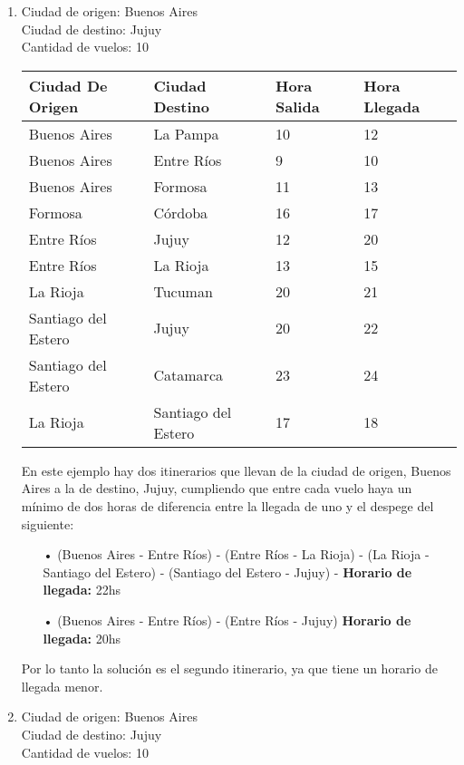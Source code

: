 \noindent \begin{enumerate}
\item
Ciudad de origen: Buenos Aires\\
Ciudad de destino: Jujuy\\
Cantidad de vuelos: 10\\

\begin{center}
	\begin{tabular}{| l | l | l | l |}
	\hline
	Ciudad De Origen & Ciudad Destino & Hora Salida & Hora Llegada\\ \hline
	Buenos Aires & La Pampa & 10 &	12\\
	Buenos Aires & Entre Ríos & 9 & 10 \\
	Buenos Aires & Formosa	&	11	& 13\\
	Formosa	& Córdoba	& 16 & 17  \\
	Entre Ríos & Jujuy	& 12 & 20\\
	Entre Ríos & La Rioja	&	13 & 15\\
	La Rioja & Tucuman	&	20 & 21\\
	Santiago del Estero & Jujuy &	20 & 22\\
	Santiago del Estero	& Catamarca & 23 & 24\\
	La Rioja & Santiago del Estero & 17&18\\
	\hline
	\end{tabular}
\end{center}


En este ejemplo hay dos itinerarios que llevan de la ciudad de origen, Buenos Aires a la de destino, Jujuy, cumpliendo que entre cada vuelo haya un mínimo de dos horas de diferencia entre la llegada de uno y el despege del siguiente:
\begin{itemize}
\item[•] (Buenos Aires - Entre Ríos) - (Entre Ríos - La Rioja) - (La Rioja - Santiago del Estero) - (Santiago del Estero - Jujuy) - \textbf{Horario de llegada: } 22hs

\item[•] (Buenos Aires - Entre Ríos) - (Entre Ríos - Jujuy) \textbf{Horario de llegada: } 20hs
\end{itemize}

Por lo tanto la solución es el segundo itinerario, ya que tiene un horario de llegada menor.\\

\item
Ciudad de origen: Buenos Aires\\
Ciudad de destino: Jujuy\\
Cantidad de vuelos: 10\\


\end{enumerate}
